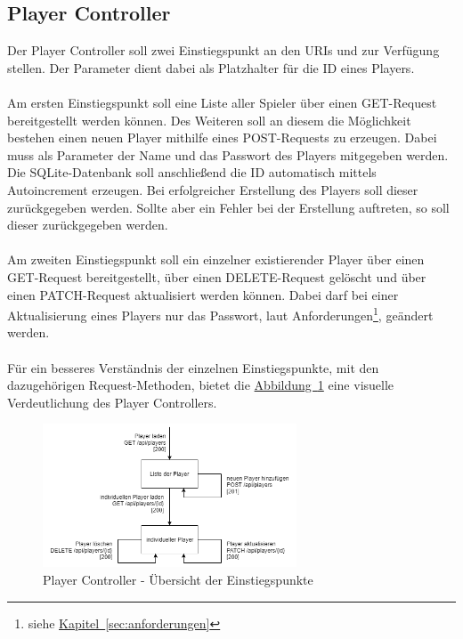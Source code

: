 \subsection{Player Controller}\label{sec:playerController}
Der Player Controller soll zwei Einstiegspunkt an den \glspl{URI}  und  zur Verfügung stellen. Der Parameter  dient dabei als Platzhalter für die ID eines Players.\\
\\
Am ersten Einstiegspunkt soll eine Liste aller Spieler über einen GET-Request bereitgestellt werden können. Des Weiteren soll an diesem die Möglichkeit bestehen einen neuen Player mithilfe eines POST-Requests zu erzeugen. Dabei muss als Parameter der Name und das Passwort des Players mitgegeben werden. Die SQLite-Datenbank soll anschließend die ID automatisch mittels Autoincrement erzeugen. Bei erfolgreicher Erstellung des Players soll dieser zurückgegeben werden. Sollte aber ein Fehler bei der Erstellung auftreten, so soll dieser zurückgegeben werden.\\
\\
Am zweiten Einstiegspunkt soll ein einzelner existierender Player über einen GET-Request bereitgestellt, über einen DELETE-Request gelöscht und über einen PATCH-Request aktualisiert werden können. Dabei darf bei einer Aktualisierung eines Players nur das Passwort, laut Anforderungen\footnote{siehe \hyperref[sec:anforderungen]{Kapitel~\ref{sec:anforderungen}}}, geändert werden.\\
\\
Für ein besseres Verständnis der einzelnen Einstiegspunkte, mit den dazugehörigen Request-Methoden, bietet die \hyperref[fig:playerController]{Abbildung~\ref{fig:playerController}} eine visuelle Verdeutlichung des Player Controllers.
\begin{figure}[htb]
	\includegraphics[width=0.672\textwidth]{images/player-controller.png}
	\caption{Player Controller - Übersicht der Einstiegspunkte}
	\label{fig:playerController}
\end{figure}

